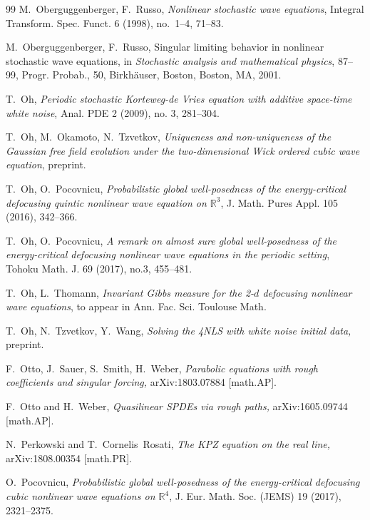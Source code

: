 \documentclass[%
11pt,  reqno]{amsart}
\newcommand{\1}{\hspace{0.2mm}\text{I}\hspace{0.2mm}}
\newcommand{\R}{\mathbb{R}}
\numberwithin{equation}{section}
\numberwithin{theorem}{section}
\begin{document}
\begin{thebibliography}{99}
M.~Oberguggenberger, F.~Russo, 
{\it Nonlinear stochastic wave equations}, Integral Transform. Spec. Funct.  6 (1998), no.~1--4, 71--83. 


M.~Oberguggenberger, F.~Russo, Singular limiting behavior in nonlinear stochastic wave equations, in {\it Stochastic analysis and mathematical physics}, 87--99, Progr. Probab., 50, Birkh\"auser, Boston, 
 Boston, MA, 2001.




T.~Oh, {\it Periodic stochastic Korteweg-de Vries equation with additive space-time white noise}, Anal. PDE 2 (2009), no. 3, 281--304. 



T.~Oh, M.~Okamoto, N.~Tzvetkov,
{\it  Uniqueness and non-uniqueness of the Gaussian free field evolution under the two-dimensional Wick ordered cubic wave equation}, preprint.

T.~Oh, O.~Pocovnicu,
{\it  Probabilistic global well-posedness of the energy-critical defocusing quintic nonlinear wave equation on $\R^3$}, J. Math. Pures Appl. 105 (2016), 342--366. 




T.~Oh, O.~Pocovnicu,
{\it  A remark on almost sure global well-posedness of the energy-critical defocusing nonlinear wave equations in the periodic setting}, Tohoku Math. J. 69 (2017), no.3, 455--481. 






T.~Oh, L.~Thomann, 
{\it Invariant Gibbs measure for 
the 2-$d$ defocusing nonlinear wave  equations}, 
to appear in Ann. Fac. Sci. Toulouse Math.


T.~Oh, N.~Tzvetkov, Y.~Wang,
{\it  Solving the 4NLS with white noise initial data,} preprint.

F.~Otto, J.~Sauer, S.~Smith,  H.~Weber,
{\it Parabolic equations with rough coefficients and singular forcing,}
arXiv:1803.07884 [math.AP].

F.~Otto and H.~Weber,
{\it Quasilinear {SPDEs} via rough paths,}
arXiv:1605.09744 [math.AP].

N.~Perkowski and T.~Cornelis~Rosati,
{\it The {KPZ} {equation} on the {real} {line},}
arXiv:1808.00354 [math.PR].


O.~Pocovnicu,
{\it Probabilistic  global well-posedness of the energy-critical defocusing  cubic nonlinear
wave equations on $\R^4$}, 
 J. Eur. Math. Soc. (JEMS) 19 (2017), 2321--2375. 





\end{thebibliography}
\end{document}
